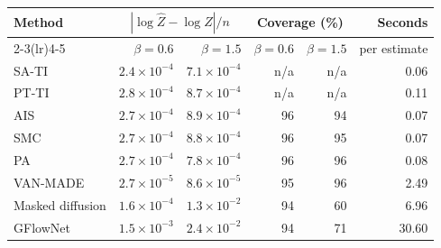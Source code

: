 \begin{tabular}{lrrrrr}
\toprule
Method & \multicolumn{2}{c}{$|\log\hat Z-\log Z|/n$} & \multicolumn{2}{c}{Coverage (\%)} & Seconds \\
\cmidrule(lr){2-3}\cmidrule(lr){4-5}
 & $\beta=0.6$ & $\beta=1.5$ & $\beta=0.6$ & $\beta=1.5$ & per estimate \\
\midrule
SA-TI & $2.4\times10^{-4}$ & $7.1\times10^{-4}$ & n/a & n/a & 0.06 \\
PT-TI & $2.8\times10^{-4}$ & $8.7\times10^{-4}$ & n/a & n/a & 0.11 \\
AIS & $2.7\times10^{-4}$ & $8.9\times10^{-4}$ & 96 & 94 & 0.07 \\
SMC & $2.7\times10^{-4}$ & $8.8\times10^{-4}$ & 96 & 95 & 0.07 \\
PA & $2.7\times10^{-4}$ & $7.8\times10^{-4}$ & 96 & 96 & 0.08 \\
\midrule
VAN-MADE & $2.7\times10^{-5}$ & $8.6\times10^{-5}$ & 95 & 96 & 2.49 \\
Masked diffusion & $1.6\times10^{-4}$ & $1.3\times10^{-2}$ & 94 & 60 & 6.96 \\
GFlowNet & $1.5\times10^{-3}$ & $2.4\times10^{-2}$ & 94 & 71 & 30.60 \\
\bottomrule
\end{tabular}
